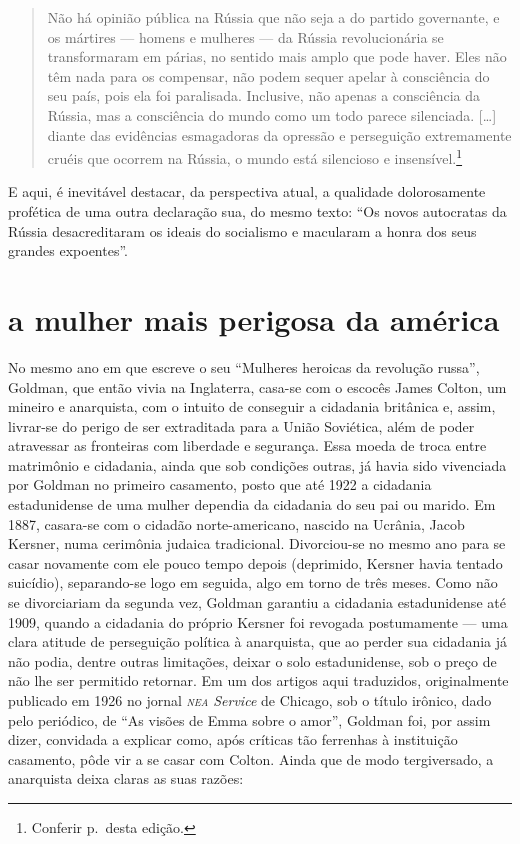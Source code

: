 \begin{quote}
Não há opinião pública na Rússia que não seja a do partido governante, e
os mártires --- homens e mulheres --- da Rússia revolucionária se
transformaram em párias, no sentido mais amplo que pode haver. Eles não
têm nada para os compensar, não podem sequer apelar à consciência do seu
país, pois ela foi paralisada. Inclusive, não apenas a consciência da
Rússia, mas a consciência do mundo como um todo parece silenciada.
{[}\ldots{]} diante das evidências esmagadoras da opressão e perseguição
extremamente cruéis que ocorrem na Rússia, o mundo está silencioso e
insensível.\footnote{Conferir p.\,\pageref{ref2} desta edição.}
\end{quote}

E aqui, é inevitável destacar, da perspectiva atual, a
qualidade dolorosamente profética de uma outra declaração sua, do mesmo texto: ``Os novos autocratas da Rússia desacreditaram os
ideais do socialismo e macularam a honra dos seus grandes expoentes''.

\section{a mulher mais perigosa da américa}

No mesmo ano em que escreve o seu ``Mulheres heroicas da revolução
russa'', Goldman, que então vivia na Inglaterra, casa-se com o escocês
James Colton, um mineiro e anarquista, com o intuito de conseguir a
cidadania britânica e, assim, livrar-se do perigo de ser
extraditada para a União Soviética, além de poder atravessar as
fronteiras com liberdade e segurança. Essa moeda de troca entre
matrimônio e cidadania, ainda que sob condições outras, já havia sido
vivenciada por Goldman no primeiro casamento, posto que até 1922 a
cidadania estadunidense de uma mulher dependia da cidadania do seu pai
ou marido. Em 1887, casara-se com o cidadão norte-americano, nascido na
Ucrânia, Jacob Kersner, numa cerimônia judaica tradicional.
Divorciou-se no mesmo ano para se casar novamente com ele pouco tempo
depois (deprimido, Kersner havia tentado suicídio), separando-se logo em
seguida, algo em torno de três meses. Como não se divorciariam da
segunda vez, Goldman garantiu a cidadania estadunidense até 1909, quando a cidadania
do próprio Kersner foi revogada postumamente --- uma clara
atitude de perseguição política à anarquista, que ao perder
sua cidadania já não podia, dentre outras limitações,
deixar o solo estadunidense, sob o preço de não lhe ser permitido
retornar. Em um dos artigos aqui traduzidos, originalmente publicado em 1926 no
jornal \textit{\textsc{nea} Service} de Chicago, sob o título irônico, dado
pelo periódico, de ``As visões de Emma sobre o amor'', Goldman foi, por
assim dizer, convidada a explicar como, após críticas tão
ferrenhas à instituição casamento, pôde vir a se casar com Colton. Ainda
que de modo tergiversado, a anarquista deixa claras as suas razões:

